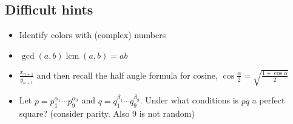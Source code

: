 \documentclass{article}
\theoremstyle{definition}
\theoremstyle{remark}
\DeclareMathOperator{\lcm}{lcm}
\begin{document}
    \subsection{Difficult hints}

    \begin{itemize}
        \item Identify colors with (complex) numbers
        \item \(\gcd(a,b)\lcm(a,b)=ab\)
        \item \(\frac{x_{n+1}}{y_{n+1}}\) and then recall the half angle formula for cosine, \(\cos\frac{\alpha}{2}=\sqrt{\frac{1+\cos\alpha}{2}}\)
        \item Let \(p=p_1^{\alpha_1}\cdots p_9^{\alpha_9}\) and \(q=q_1^{\beta_1}\cdots q_9^{\beta_9}\). Under what conditions is \(pq\) a perfect square? (consider parity. Also 9 is not random)
    \end{itemize}
\end{document}
